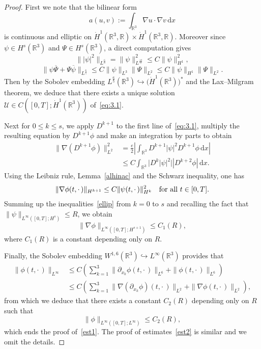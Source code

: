 \documentclass[AHL,Unicode,longabstracts]{cedram}
\newcommand{\R}{\mathbb{R}}
\newcommand*{\dd}{\mathrm{d}}
\newcommand*{\dx}{\dd x}
\begin{document}
\begin{proof}
First we note that the bilinear form
\[
a(u,v):=\int_{\R^3} \nabla u\cdot \nabla v \,\dx
\]
is continuous and elliptic on $\dot{H}^1(\R^3,\R) \times \dot{H}^1(\R^3,\R)$. Moreover since $\psi \in H^s(\R^3)$ and $\Psi \in H^s(\R^3)$, a direct computation gives
\[
\big\| |\psi|^2 \big\|_{L^{\frac{6}{5}}}
= \| \psi \|_{L^{\frac{12}{5}}}^2 \leq C \| \psi \|_{H^1}^2,
\]
\[
\| \psi \overline{\Psi}+ \Psi \overline{\psi} \|_{L^{\frac{6}{5}}}
\leq C \| \psi \|_{L^3} \| \Psi \|_{L^2} \leq C \| \psi \|_{H^1} \| \Psi \|_{L^2}.
\]
Then by the Sobolev embedding $L^{\frac{6}{5}}(\R^3) \hookrightarrow \big(\dot{H}^1(\R^3)\big)^*$ and the Lax--Milgram theorem, we deduce that there exists a unique solution $\mathcal{U} \in C([0,T];\dot{H}^1(\R^3))$ of~\eqref{eq:3.1}.

Next for $0 \le k \le s$, we apply $D^{k+1}$ to the first line of~\eqref{eq:3.1}, multiply the resulting equation by $D^{k+1} \phi$ and make an integration by parts to obtain
\begin{align*}
\| \nabla (D^{k+1} \phi) \|_{L^2}^2 &= \frac{e}{2} \left | \int_{\R^3} D^{k+1}|\psi |^2 D^{k+1} \phi \,\dx \right | \nonumber \\
& \le C \int_{\R^3} \big| D^{k}|\psi |^2 \big| |D^{k+2} \phi| \,\dx.
\end{align*}
Using the Leibniz rule, Lemma~\ref{alhinac} and the Schwarz inequality, one has
\begin{equation}\label{ellip}
\| \nabla \phi(t,{\cdot\,}) \|_{H^{k+1}}
\le C \| \psi (t,{\cdot\,}) \|_{H^k}^2 \quad
\hbox{for all} \ t \in [0,T].
\end{equation}
Summing up the inequalities~\eqref{ellip} from $k=0$ to $s$ and recalling the fact that $\| \psi \|_{L^\infty([0,T];H^s)}\leq R$, we obtain
\[
\| \nabla\phi \|_{L^\infty([0,T];H^{s+1})}\leq C_1(R),
\]
where $C_1(R)$ is a constant depending only on $R$.

Finally, the Sobolev embedding $W^{1,6}(\R^3) \hookrightarrow L^\infty(\R^3)$ provides that
\begin{align*}
\| \phi(t,{\cdot\,}) \|_{L^\infty} &\leq C \left(\sum_{k=1}^3 \| \partial_{x_k} \phi(t,{\cdot\,}) \|_{L^6} +\| \phi(t,{\cdot\,}) \|_{L^6} \right) \\
&\le C \left(\sum_{k=1}^3 \| \nabla (\partial_{x_k} \phi)(t,{\cdot\,}) \|_{L^2} +\| \nabla \phi(t,{\cdot\,}) \|_{L^2} \right),
\end{align*}
from which we deduce that there exists a constant $C_2(R)$ depending only on $R$ such that
\[
\| \phi \|_{L^\infty([0,T];L^\infty)} \leq C_2(R),
\]
which ends the proof of~\eqref{est1}. The proof of estimates~\eqref{est2} is similar and we omit the details.
\end{proof}
\end{document}
